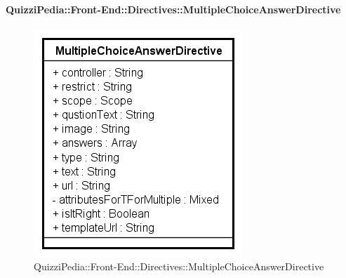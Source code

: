 	\paragraph{QuizziPedia::Front-End::Directives::MultipleChoiceAnswerDirective}
		
		\label{QuizziPedia::Front-End::Directives::MultipleChoiceAnswerDirective}
		
		\begin{figure}[ht]
			\centering
			\includegraphics[scale=0.80,keepaspectratio]{UML/Classi/Front-End/QuizziPedia_Front-end_Templates_MultipleChoiceAnswerTemplate.png}
			\caption{QuizziPedia::Front-End::Directives::MultipleChoiceAnswerDirective}
		\end{figure} \FloatBarrier
		
